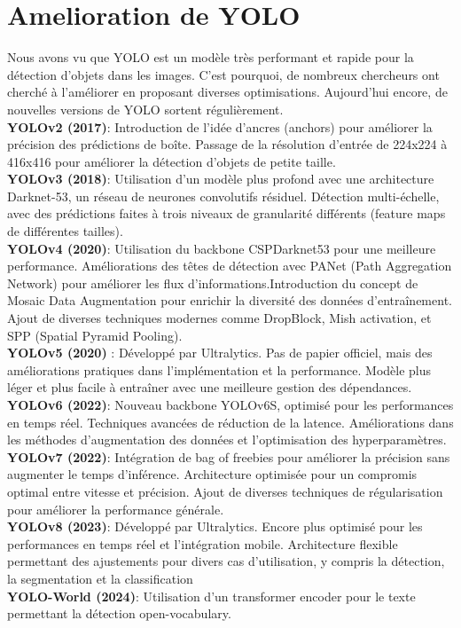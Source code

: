 \documentclass[11pt,a4paper]{article}
\begin{document}
\section{Amelioration de YOLO}
Nous avons vu que YOLO est un modèle très performant et rapide pour la détection d’objets dans les images. C’est pourquoi, de nombreux chercheurs ont cherché à l’améliorer en proposant diverses optimisations. Aujourd’hui encore, de nouvelles versions de YOLO sortent régulièrement.\\[0.2cm]
\textbf{YOLOv2 (2017)}: Introduction de l’idée d’ancres (anchors) pour améliorer la précision des prédictions de boîte. Passage de la résolution d’entrée de 224x224 à 416x416 pour améliorer la détection d’objets de petite taille.\\[0.1cm]
\textbf{YOLOv3 (2018)}: Utilisation d’un modèle plus profond avec une architecture Darknet-53, un réseau de neurones convolutifs résiduel. Détection multi-échelle, avec des prédictions faites à trois niveaux de granularité différents (feature maps de différentes tailles).\\[0.1cm]
\textbf{YOLOv4 (2020)}: Utilisation du backbone CSPDarknet53 pour une meilleure performance. Améliorations des têtes de détection avec PANet (Path Aggregation Network) pour améliorer les flux d’informations.Introduction du concept de Mosaic Data Augmentation pour enrichir la diversité des données d’entraînement. Ajout de diverses techniques modernes comme DropBlock, Mish activation, et SPP (Spatial Pyramid Pooling).\\[0.1cm]
\textbf{YOLOv5 (2020)} : Développé par Ultralytics. Pas de papier officiel, mais des améliorations pratiques dans l’implémentation et la performance. Modèle plus léger et plus facile à entraîner avec une meilleure gestion des dépendances.\\[0.1cm]
\textbf{YOLOv6 (2022)}: Nouveau backbone YOLOv6S, optimisé pour les performances en temps réel. Techniques avancées de réduction de la latence. Améliorations dans les méthodes d’augmentation des données et l’optimisation des hyperparamètres.\\[0.1cm]
\textbf{YOLOv7 (2022)}: Intégration de bag of freebies pour améliorer la précision sans augmenter le temps d’inférence. Architecture optimisée pour un compromis optimal entre vitesse et précision. Ajout de diverses techniques de régularisation pour améliorer la performance générale.\\[0.1cm]
\textbf{YOLOv8 (2023)}: Développé par Ultralytics. Encore plus optimisé pour les performances en temps réel et l’intégration mobile. Architecture flexible permettant des ajustements pour divers cas d’utilisation, y compris la détection, la segmentation et la classification\\[0.1cm]
\textbf{YOLO-World (2024)}: Utilisation d’un transformer encoder pour le texte permettant la détection open-vocabulary.
\end{document}
